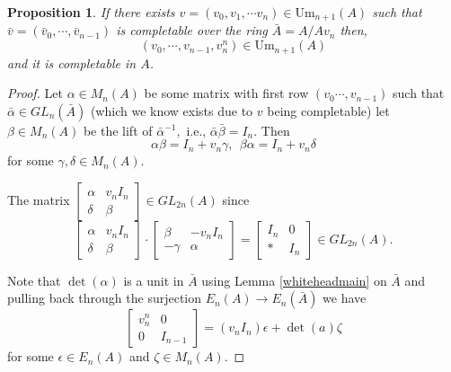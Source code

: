 \documentclass[12pt]{report}
\numberwithin{equation}{section}
\newcounter{dummy} \numberwithin{dummy}{section}
\newtheorem{proposition}[dummy]{Proposition}
\begin{document}
	
%	
	\begin{proposition} If there exists $v=(v_0, v_1, \cdots v_n) \in \mathrm{Um}_{n+1}(A)$ such that $\bar{v}=(\bar{v}_0, \cdots, \bar{v}_{n-1})$ is completable over the ring $\bar{A}=A/Av_n$ then, $$(v_0,\cdots, v_{n-1} ,v_n^n) \in \mathrm{Um}_{n+1}(A)$$ and it is completable in $A$.
		
	\end{proposition}
	\begin{proof}
		Let $\alpha \in M_{n}(A)$ be some matrix with first row $(v_0 \cdots, v_{n-1})$ such that $\bar{\alpha} \in GL_{n}(\bar{A})$ (which we know exists due to $v$ being completable) let $\beta \in M_{n}(A)$ be the lift of $\bar{\alpha}^{-1},$ i.e., $\bar{\alpha}\bar{\beta} = I_{n}$. Then $$\alpha \beta= I_n+v_n \gamma, \ \ \beta \alpha=I_n+v_n \delta$$ for some $\gamma,\delta \in M_{n}(A)$.
		
		The matrix $\begin{bmatrix}
			\alpha & v_n I_{n}\\
			\delta & \beta 
		\end{bmatrix} \in GL_{2n}(A)$ since $$\begin{bmatrix}
		\alpha & v_n I_n\\ \delta & \beta 
		\end{bmatrix} \cdot \begin{bmatrix}
		\beta & -v_n I_n \\ -\gamma & \alpha 
		\end{bmatrix} = \begin{bmatrix}
		I_n & 0 \\ * & I_n
		\end{bmatrix} \in GL_{2n}(A).$$ 
		
		Note that $\det(\alpha)$ is a unit in $\bar{A}$ using Lemma \ref{whiteheadmain} on $\bar{A}$ and pulling back through the surjection $E_n(A) \to E_n(\bar{A})$ we have $$\begin{bmatrix}
			v_n^n & 0 \\ 0 & I_{n-1}
		\end{bmatrix} = (v_n I_n) \epsilon + \det(a) \zeta $$ for some $\epsilon \in E_n(A)$ and $\zeta  \in M_n(A)$.
		

\end{proof}
\end{document}
